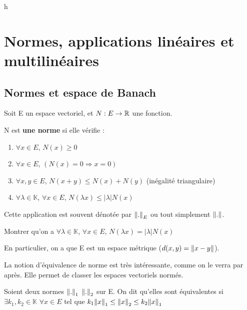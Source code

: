 h\chapter{Normes, applications linéaires et multilinéaires}
\label{chapter:linear_application}



\section{Normes et espace de Banach}

\begin{definition}
    Soit E un espace vectoriel, et $N : E \rightarrow 
\mathbb{R}$ une fonction.

	N est \textbf{une norme} si elle vérifie :
    \begin{enumerate}
        \item $\forall x \in E$, $N(x) \geq 0$
        \item $\forall x \in E$, $(N(x) = 0 \Rightarrow x = 0)$
        \item $\forall x, y \in E$, $N(x + y) \leq N(x) + N(y)$ (inégalité
            triangulaire)
        \item $\forall \lambda \in \mathbb{K}$, $\forall x \in E$, $N(\lambda x)
            \leq |\lambda| N(x)$
    \end{enumerate}
    Cette application est souvent dénotée par $\norm{.}_{E}$ ou tout simplement
    $\norm{.}$.
\end{definition}

\begin{exercice}
    Montrer qu'on a
    $\forall \lambda \in \mathbb{K}$, $\forall x \in E$, $N(\lambda x) =
    |\lambda| N(x)$
\end{exercice}

En particulier, on a que E est un espace métrique ($d(x, y) = \norm{x - y}$).

La notion d'équivalence de norme est très intéressante, comme on le verra par
après. Elle permet de classer les espaces vectoriels normés.

\begin{definition}
    Soient deux normes $\norm{.}_{1}$ $\norm{.}_{2}$ sur E. On dit
	qu'elles sont équivalentes si $\exists k_{1}, k_{2} \in \mathbb{K}$ $\forall
	x \in E$ tel que $k_{1} \norm{x}_{1} \leq \norm{x}_{2} \leq
	k_{2} \norm{x}_{1}$
\end{definition}

